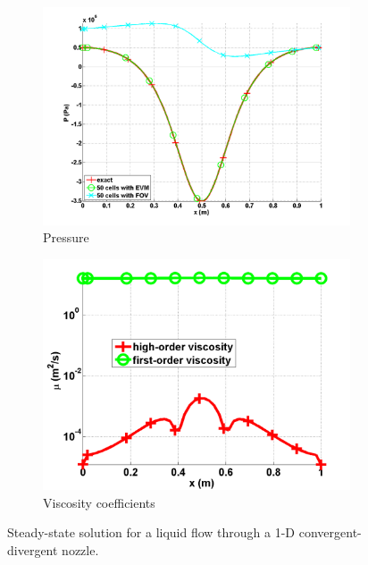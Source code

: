 \documentclass[preprint,10pt]{elsarticle}
\begin{document}
\begin{figure}[H]
\begin{subfigure}[b]{0.495\textwidth}
        \end{subfigure}
        \begin{subfigure}[b]{0.495\textwidth}
                \centering
                \includegraphics[width=\textwidth]{liquid_pressure_numerical_and_exact_50.png}
                \caption{Pressure}
                \label{fig:1d_nozzle_liq_press}
        \end{subfigure}
        \begin{subfigure}[b]{0.495\textwidth}
                \centering
                \includegraphics[width=\textwidth]{liquid_viscosity_numerical50.png}
                \caption{Viscosity coefficients}
                \label{fig:1d_nozzle_liq_visc}
        \end{subfigure}
        \caption{Steady-state solution for a liquid flow through a 1-D convergent-divergent nozzle.}\label{fig:1d_liq_nozzle}
\end{figure}
\end{document}
